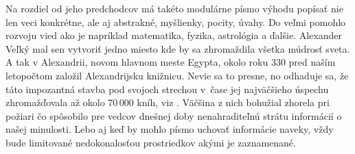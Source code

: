 \documentclass[11pt, a4paper]{article}
\begin{document}
Na rozdiel od jeho predchodcov má takéto modulárne písmo výhodu popísať nie len veci konkrétne, ale aj abstrakné, myšlienky, pocity, úvahy. Do veľmi pomohlo rozvoju vied ako je napríklad matematika, fyzika, astrológia a ďalšie. Alexander Veľký mal sen vytvoriť jedno miesto kde by sa zhromaždila všetka múdrosť sveta. A tak v Alexandrii, novom hlavnom meste Egypta, okolo roku 330 pred naším letopočtom založil Alexandrijsku knižnicu. Nevie sa to presne, no odhaduje sa, že táto impozantná stavba pod svojoch strechou v~čase jej najväčšieho úspechu zhromažďovala až okolo 70\,000 kníh, viz \cite{Alexandria_Library}. Väčšina z nich bohužial zhorela pri požiari čo spôsobilo pre vedcov dnešnej doby nenahraditeľnú strátu informácií o našej minulosti. Lebo aj keď by mohlo písmo uchovať informácie naveky, vždy bude limitované nedokonalosťou prostriedkov akými je zaznamenané.



    
\end{document}
